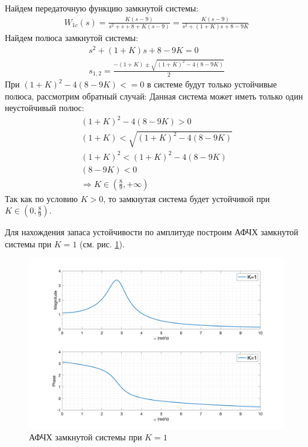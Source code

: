 Найдем передаточную функцию замкнутой системы:
\begin{eqnarray}
    W_{1c}(s) = \frac{K(s - 9)}{s^2 + s + 8 + K(s - 9)} = \frac{K(s - 9)}{s^2 + (1 + K)s + 8 - 9K}
\end{eqnarray}
Найдем полюса замкнутой системы:
\begin{equation}
    \begin{array}{ll}
        s^2 + (1 + K)s + 8 - 9K = 0 \\
        s_{1, 2} = \frac{-(1 + K) \pm \sqrt{(1 + K)^2 - 4(8 - 9K)}}{2}
    \end{array}
\end{equation}
При $(1 + K)^2 - 4(8 - 9K) <= 0$ в системе будут только устойчивые полюса, рассмотрим обратный случай:
Данная система может иметь только один неустойчивый полюс: 
\begin{equation}
    \begin{array}{ll}
        (1 + K)^2 - 4(8 - 9K) > 0 \\ 
        (1 + K) < \sqrt{(1 + K)^2 - 4(8 - 9K)} \\
        (1 + K)^2 < (1 + K)^2 - 4(8 - 9K) \\
        (8 - 9K) < 0 \\
        \Rightarrow K \in \left(\frac{8}{9}, +\infty\right)
    \end{array}
\end{equation}
Так как по условию $K > 0$, то замкнутая система будет устойчивой при $K \in \left(0, \frac{8}{9}\right)$.

Для нахождения запаса устойчивости по амплитуде построим АФЧХ замкнутой системы при $K = 1$ (см. рис. \ref{fig:task4_freqs}).
\begin{figure}[ht!]
    \centering
    \includegraphics[width=\textwidth]{media/plots/task4_freqs.png}
    \caption{АФЧХ замкнутой системы при $K = 1$}
    \label{fig:task4_freqs}
\end{figure}

